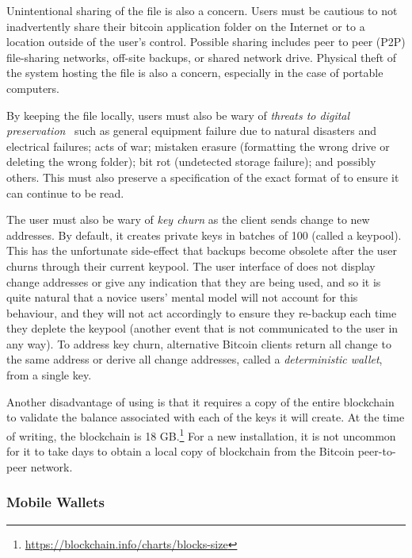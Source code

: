 Unintentional sharing of the \walletfile file is also a concern. Users must be cautious to not inadvertently share their bitcoin application folder on the Internet or to a location outside of the user's control. Possible sharing includes peer to peer (P2P) file-sharing networks, off-site backups, or shared network drive. Physical theft of the system hosting the \walletfile file is also a concern, especially in the case of portable computers.

By keeping the \walletfile file locally, users must also be wary of \textit{threats to digital preservation}~\cite{BKM05} such as general equipment failure due to natural disasters and electrical failures; acts of war; mistaken erasure (\eg formatting the wrong drive or deleting the wrong folder); bit rot (\ie undetected storage failure); and possibly others. This must also preserve a specification of the exact format of \walletfile to ensure it can continue to be read. 

The user must also be wary of \textit{key churn} as the \bitcoinclient client sends change to new addresses. By default, it creates private keys in batches of 100 (called a keypool). This has the unfortunate side-effect that backups become obsolete after the user churns through their current keypool. The user interface of \bitcoinclient does not display change addresses or give any indication that they are being used, and so it is quite natural that a novice users' mental model will not account for this behaviour, and they will not act accordingly to ensure they re-backup \walletfile each time they deplete the keypool (another event that is not communicated to the user in any way). To address key churn, alternative Bitcoin clients return all change to the same address or derive all change addresses, called a \textit{deterministic wallet}, from a single key.

Another disadvantage of using \bitcoinclient is that it requires a copy of the entire blockchain to validate the balance associated with each of the keys it will create. At the time of writing, the blockchain is 18 GB.\footnote{\url{https://blockchain.info/charts/blocks-size}} For a new installation, it is not uncommon for it to take days to obtain a local copy of blockchain from the Bitcoin peer-to-peer network.

\subsubsection{Mobile Wallets}

